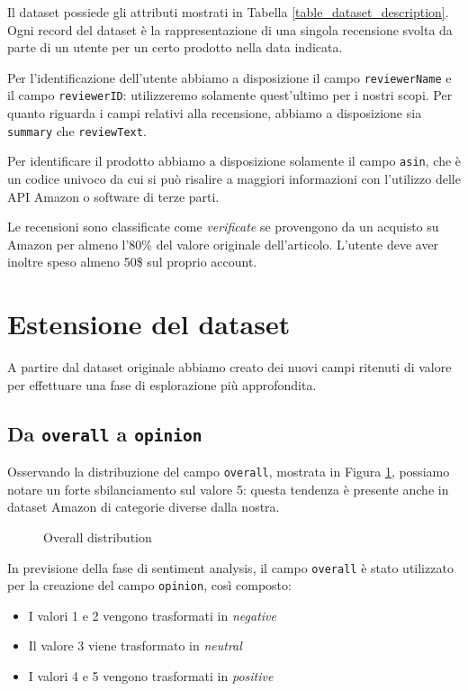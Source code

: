 Il dataset possiede gli attributi mostrati in Tabella \ref{table_dataset_description}. Ogni record del dataset è la rappresentazione di una singola recensione svolta da parte di un utente per un certo prodotto nella data indicata. 
\par
Per l'identificazione dell'utente abbiamo a disposizione il campo \texttt{reviewerName} e il campo \texttt{reviewerID}: utilizzeremo solamente quest'ultimo per i nostri scopi.
Per quanto riguarda i campi relativi alla recensione, abbiamo a disposizione sia \texttt{summary} che \texttt{reviewText}.
\par
Per identificare il prodotto abbiamo a disposizione solamente il campo \texttt{asin}, che è un codice univoco da cui si può risalire a maggiori informazioni con l'utilizzo delle API Amazon o software di terze parti. 
\par
Le recensioni sono classificate come \textit{verificate} se provengono da un acquisto su Amazon per almeno l'80\% del valore originale dell'articolo. L'utente deve aver inoltre speso almeno 50\$ sul proprio account.

\section{Estensione del dataset}

A partire dal dataset originale abbiamo creato dei nuovi campi ritenuti di valore per effettuare una fase di esplorazione più approfondita. 

\subsection{Da \texttt{overall} a \texttt{opinion}}
\label{overall_opinion}
Osservando la distribuzione del campo \texttt{overall}, mostrata in Figura \ref{overall_distribution}, possiamo notare un forte sbilanciamento sul valore 5: questa tendenza è presente anche in dataset Amazon di categorie diverse dalla nostra.

\begin{figure}[H]
  \centering
  
  \caption{Overall distribution}
  \label{overall_distribution}
\end{figure}

In previsione della fase di sentiment analysis, il campo \texttt{overall} è stato utilizzato per la creazione del campo \texttt{opinion}, così composto:

\begin{itemize}
    \item I valori 1 e 2 vengono trasformati in \textit{negative}
    \item Il valore 3 viene trasformato in \textit{neutral}
    \item I valori 4 e 5 vengono trasformati in \textit{positive}
\end{itemize}

